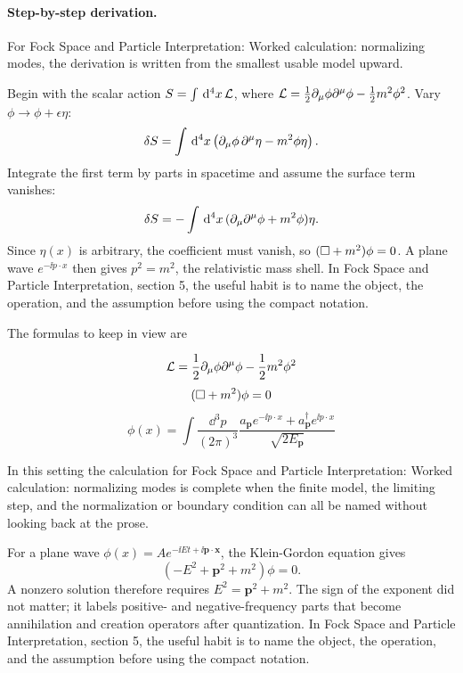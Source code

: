 \paragraph{Step-by-step derivation.}

For Fock Space and Particle Interpretation: Worked calculation: normalizing modes, the derivation is written from the smallest usable model upward.

Begin with the scalar action \(S=\int\,\mathrm d^4x\,\mathcal L\), where \(\mathcal L=\frac12\partial_\mu\phi\partial^\mu\phi-\frac12m^2\phi^2\).  Vary \(\phi\to\phi+\epsilon\eta\):
\[
  \delta S=\int\,\mathrm d^4x\left(\partial_\mu\phi\,\partial^\mu\eta-m^2\phi\eta\right).
\]
Integrate the first term by parts in spacetime and assume the surface term vanishes:
\[
  \delta S=-\int\,\mathrm d^4x\,(\partial_\mu\partial^\mu\phi+m^2\phi)\eta.
\]
Since \(\eta(x)\) is arbitrary, the coefficient must vanish, so \((\Box+m^2)\phi=0\).  A plane wave \(e^{-\ii p\cdot x}\) then gives \(p^2=m^2\), the relativistic mass shell.  In Fock Space and Particle Interpretation, section 5, the useful habit is to name the object, the operation, and the assumption before using the compact notation.

The formulas to keep in view are

\[
  \mathcal L=\frac12\partial_\mu\phi\partial^\mu\phi-\frac12m^2\phi^2
\]
\[
  (\Box+m^2)\phi=0
\]
\[
  \phi(x)=\int\frac{\dd^3p}{(2\pi)^3}\frac{a_{\bm p}e^{-\ii p\cdot x}+a_{\bm p}^\dagger e^{\ii p\cdot x}}{\sqrt{2E_{\bm p}}}
\]

In this setting the calculation for Fock Space and Particle Interpretation: Worked calculation: normalizing modes is complete when the finite model, the limiting step, and the normalization or boundary condition can all be named without looking back at the prose.




\begin{example}
For a plane wave \(\phi(x)=Ae^{-\ii Et+\ii\bm p\cdot\bm x}\), the Klein-Gordon equation gives
\[
  (-E^2+\bm p^2+m^2)\phi=0.
\]
A nonzero solution therefore requires \(E^2=\bm p^2+m^2\).  The sign of the exponent did not matter; it labels positive- and negative-frequency parts that become annihilation and creation operators after quantization.  In Fock Space and Particle Interpretation, section 5, the useful habit is to name the object, the operation, and the assumption before using the compact notation.
\end{example}



